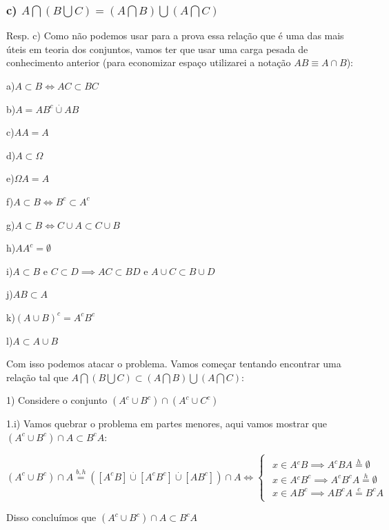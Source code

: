 \documentclass[english]{article}
\begin{document}
\subsubsection*{\textmd{c) $A\bigcap(B\bigcup C)=(A\bigcap B)\bigcup(A\bigcap C)$}}

Resp. c) Como não podemos usar para a prova essa relação que é uma
das mais úteis em teoria dos conjuntos, vamos ter que usar uma carga
pesada de conhecimento anterior (para economizar espaço utilizarei
a notação $AB\equiv A\cap B$):

a)$A\subset B\Longleftrightarrow AC\subset BC$

b)$A=AB^{c}\overset{.}{\cup}AB$

c)$AA=A$

d)$A\subset\Omega$

e)$\Omega A=A$

f)$A\subset B\Longleftrightarrow B^{c}\subset A^{c}$

g)$A\subset B\Longleftrightarrow C\cup A\subset C\cup B$

h)$AA^{c}=\emptyset$

i)$A\subset B$ e $C\subset D\implies AC\subset BD$ e $A\cup C\subset B\cup D$

j)$AB\subset A$

k)$(A\cup B)^{c}=A^{c}B^{c}$

l)$A\subset A\cup B$

Com isso podemos atacar o problema. Vamos começar tentando encontrar
uma relação tal que $A\bigcap(B\bigcup C)\subset(A\bigcap B)\bigcup(A\bigcap C)$:

1) Considere o conjunto $(A^{c}\cup B^{c})\cap(A^{c}\cup C^{c})$

1.i) Vamos quebrar o problema em partes menores, aqui vamos mostrar
que $(A^{c}\cup B^{c})\cap A\subset B^{c}A$:

$(A^{c}\cup B^{c})\cap A\overset{b,h}{=}([A^{c}B]\overset{.}{\cup}[A^{c}B^{c}]\overset{.}{\cup}[AB^{c}])\cap A\Longleftrightarrow\begin{cases}
\begin{array}{c}
x\in A{}^{c}B\implies A^{c}BA\overset{h}{=}\emptyset\\
x\in A{}^{c}B^{c}\implies A^{c}B^{c}A\overset{h}{=}\emptyset\\
x\in AB^{c}\implies AB^{c}A\overset{c}{=}B^{c}A
\end{array}\end{cases}$

Disso concluímos que $(A^{c}\cup B^{c})\cap A\subset B^{c}A$
\end{document}
